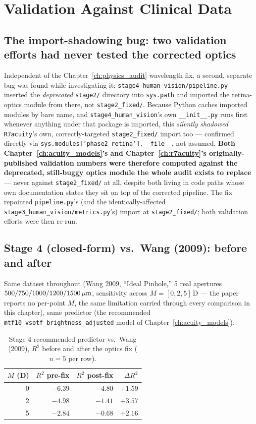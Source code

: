 \chapter{Validation Against Clinical Data}
\label{ch:validation}

\section{The import-shadowing bug: two validation efforts had never tested the corrected optics}

Independent of the Chapter~\ref{ch:physics_audit} wavelength fix, a second, separate
bug was found while investigating it: \texttt{stage4\_human\_vision/pipeline.py}
inserted the \emph{deprecated} \texttt{stage2/} directory into \texttt{sys.path} and
imported the retina-optics module from there, not \texttt{stage2\_fixed/}. Because
Python caches imported modules by bare name, and \texttt{stage4\_human\_vision}'s own
\texttt{\_\_init\_\_.py} runs first whenever anything under that package is imported,
this \emph{silently shadowed} \texttt{R7acuity}'s own, correctly-targeted
\texttt{stage2\_fixed/} import too --- confirmed directly via
\texttt{sys.modules['phase2\_retina'].\_\_file\_\_}, not assumed. \textbf{Both
Chapter~\ref{ch:acuity_models}'s and Chapter~\ref{ch:r7acuity}'s originally-published
validation numbers were therefore computed against the deprecated, still-buggy optics
module the whole audit exists to replace} --- never against \texttt{stage2\_fixed/} at
all, despite both living in code paths whose own documentation states they sit on top
of the corrected pipeline. The fix repointed \texttt{pipeline.py}'s (and the identically-affected
\texttt{stage3\_human\_vision/metrics.py}'s) import at \texttt{stage2\_fixed/}; both
validation efforts were then re-run.

\section{Stage 4 (closed-form) vs.\ Wang (2009): before and after}

Same dataset throughout (Wang 2009, ``Ideal Pinhole,'' 5 real apertures $500/750/1000/
1200/1500\,\mu\text{m}$, sensitivity across $M=[0,2,5]\,$D --- the paper reports no per-point
$M$, the same limitation carried through every comparison in this chapter), same
predictor (the recommended \texttt{mtf10\_vsotf\_brightness\_adjusted} model of
Chapter~\ref{ch:acuity_models}).

\begin{table}[htbp]
\centering
\begin{tabular}{rrrr}
\toprule
$M$ (D) & $R^2$ pre-fix & $R^2$ post-fix & $\Delta R^2$ \\
\midrule
0 & $-6.39$ & $-4.80$ & $+1.59$ \\
2 & $-4.98$ & $-1.41$ & $+3.57$ \\
5 & $-2.84$ & $-0.68$ & $+2.16$ \\
\bottomrule
\end{tabular}
\caption{Stage 4 recommended predictor vs.\ Wang (2009), $R^2$ before and after the optics fix ($n=5$ per row).}
\label{tab:stage4-prepost}
\end{table}

